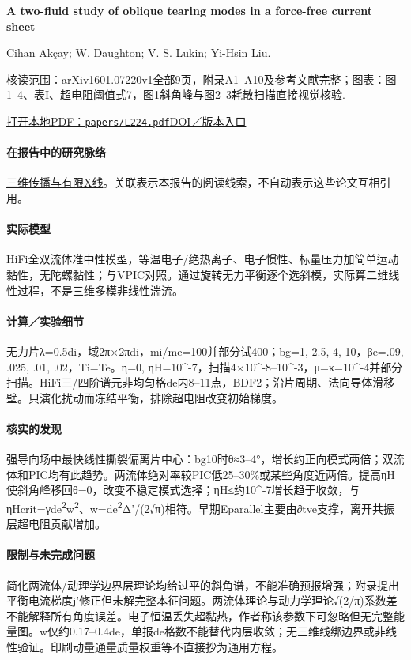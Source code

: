 \textbf{A two-fluid study of oblique tearing modes in a force-free current sheet}\citep{L224}\

Cihan Akçay;  W. Daughton;  V. S. Lukin;  Yi-Hsin Liu.

\textsf{核读范围：}arXiv1601.07220v1全部9页，附录A1–A10及参考文献完整；\textsf{图表：}图1–4、表I、超电阻阈值式7，图1斜角峰与图2–3耗散扫描直接视觉核验.

\href{run:papers/L224.pdf}{打开本地PDF：\texttt{papers/L224.pdf}}\quad\href{https://doi.org/10.1063/1.4940945}{DOI／版本入口}

\paragraph{在报告中的研究脉络}\hyperref[story:three]{三维传播与有限X线}。关联表示本报告的阅读线索，不自动表示这些论文互相引用。

\paragraph{实际模型}HiFi全双流体准中性模型，等温电子/绝热离子、电子惯性、标量压力加简单运动黏性，无陀螺黏性；与VPIC对照。通过旋转无力平衡逐个选斜模，实际算二维线性过程，不是三维多模非线性湍流。

\paragraph{计算／实验细节}无力片λ=0.5di，域2π×2πdi，mi/me=100并部分试400；bg=1, 2.5, 4, 10，βe=.09, .025, .01, .02，Ti=Te。η=0, ηH=10\textasciicircum{}-7，扫描4×10\textasciicircum{}-8–10\textasciicircum{}-3，μ=κ=10\textasciicircum{}-4并部分扫描。HiFi三/四阶谱元非均匀格de内8–11点，BDF2；沿片周期、法向导体滑移壁。只演化扰动而冻结平衡，排除超电阻改变初始梯度。

\paragraph{核实的发现}强导向场中最快线性撕裂偏离片中心：bg10时θ≈3–4°，增长约正向模式两倍；双流体和PIC均有此趋势。两流体绝对率较PIC低25–30\%或某些角度近两倍。提高ηH使斜角峰移回θ=0，改变不稳定模式选择；ηH≤约10\textasciicircum{}-7增长趋于收敛，与ηHcrit=γde\textsuperscript{2}w\textsuperscript{2}、w=de\textsuperscript{2}Δ'/(2√π)相符。早期Eparallel主要由∂tve支撑，离开共振层超电阻贡献增加。

\paragraph{限制与未完成问题}简化两流体/动理学边界层理论均给过平的斜角谱，不能准确预报增强；附录提出平衡电流梯度j'修正但未解完整本征问题。两流体理论与动力学理论√(2/π)系数差不能解释所有角度误差。电子恒温丢失超黏热，作者称该参数下可忽略但无完整能量图。w仅约0.17–0.4de，单报de格数不能替代内层收敛；无三维线绑边界或非线性验证。印刷动量通量质量权重等不直接抄为通用方程。

